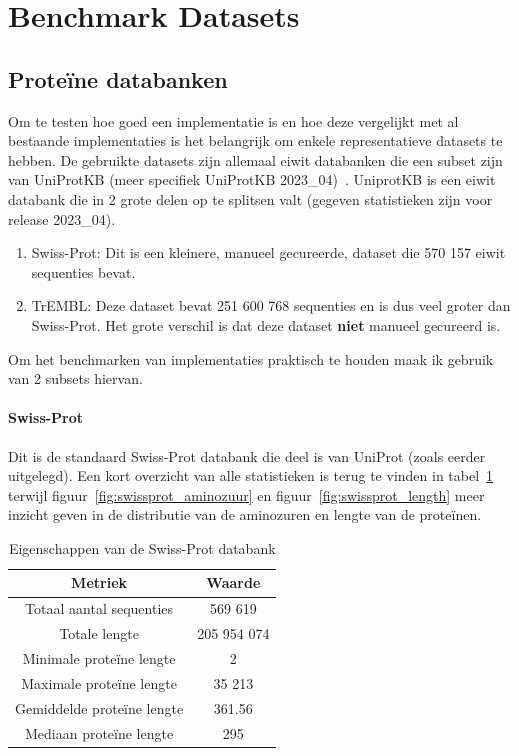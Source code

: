 \documentclass[11pt,dutch,faculty=we,layout=titlefont,underline=false,titleUppercase=true,titleUnderline=true]{ugent2016-report}
\begin{document}
    \section{Benchmark Datasets}\label{sec:datasets}

    \subsection{Proteïne databanken}\label{subsec:proteine-databanken}
    Om te testen hoe goed een implementatie is en hoe deze vergelijkt met al bestaande implementaties is het belangrijk om enkele representatieve datasets te hebben.
    De gebruikte datasets zijn allemaal eiwit databanken die een subset zijn van UniProtKB (meer specifiek UniProtKB 2023\_04)~\cite{UniprotKB}.
    UniprotKB is een eiwit databank die in 2 grote delen op te splitsen valt (gegeven statistieken zijn voor release 2023\_04).
    \begin{enumerate}
        \item Swiss-Prot: Dit is een kleinere, manueel gecureerde, dataset die 570 157 eiwit sequenties bevat.
        \item TrEMBL: Deze dataset bevat 251 600 768 sequenties en is dus veel groter dan Swiss-Prot.
        Het grote verschil is dat deze dataset \textbf{niet} manueel gecureerd is.
    \end{enumerate}

    Om het benchmarken van implementaties praktisch te houden maak ik gebruik van 2 subsets hiervan.

    \paragraph{Swiss-Prot} Dit is de standaard Swiss-Prot databank die deel is van UniProt (zoals eerder uitgelegd).
    Een kort overzicht van alle statistieken is terug te vinden in tabel~\ref{tab:swissprot_eigenschappen} terwijl figuur~\ref{fig:swissprot_aminozuur} en figuur~\ref{fig:swissprot_length} meer inzicht geven in de distributie van de aminozuren en lengte van de proteïnen.

    \begin{table}[h!]
        \centering
        \begin{tabular}{c c}
            Metriek                    & Waarde      \\
            \hline\hline
            Totaal aantal sequenties   & 569 619     \\
            Totale lengte              & 205 954 074 \\
            Minimale proteïne lengte   & 2           \\
            Maximale proteïne lengte   & 35 213      \\
            Gemiddelde proteïne lengte & 361.56      \\
            Mediaan proteïne lengte    & 295         \\
            \hline
        \end{tabular}
        \caption{Eigenschappen van de Swiss-Prot databank}
        \label{tab:swissprot_eigenschappen}
    \end{table}
\end{document}
